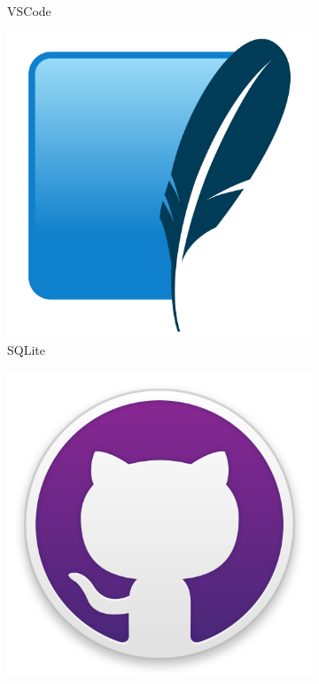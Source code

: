 \begin{figure}[!tbp]
\begin{subfigure}[b]{0.1\textwidth}
	\caption{VSCode}
\end{subfigure}
\hfill
\begin{subfigure}[b]{0.1\textwidth}
	\includegraphics[width=\textwidth, height=\textwidth]{imagenes/software_usado/icono_sqlite.png}
	\caption{SQLite}
\end{subfigure}
\newline
\begin{subfigure}[b]{0.1\textwidth}
	\includegraphics[width=\textwidth, height=\textwidth]{imagenes/software_usado/icono_github_desktop.png}

\end{subfigure}
\end{figure}
